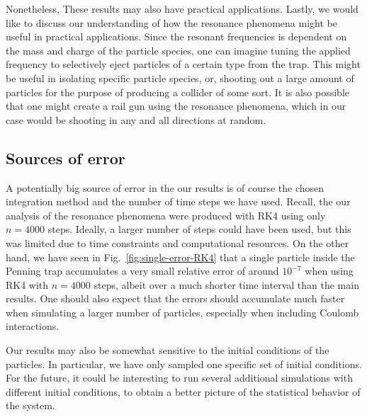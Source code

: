 \documentclass[english,notitlepage,reprint]{revtex4-2}  %
\begin{document}
Nonetheless, These results may also have practical applications.
Lastly, we would like to discuss our understanding of how the resonance phenomena might be useful in practical applications. Since the resonant frequencies is dependent on the mass and charge of the particle species, one can imagine tuning the applied frequency to selectively eject particles of a certain type from the trap. This might be useful in isolating specific particle species, or, shooting out a large amount of particles for the purpose of producing a collider of some sort. It is also possible that one might create a rail gun using the resonance phenomena, which in our case would be shooting in any and all directions at random. 


\subsection{Sources of error}
A potentially big source of error in the our results is of course the chosen integration method and the number of time steps we have used.
Recall, the our analysis of the resonance phenomena were produced with RK4 using only $n=4000$ steps. Ideally, a larger number of steps could have been used, but this was limited due to time constraints and computational resources. On the other hand, we have seen in Fig.~\ref{fig:single-error-RK4} that a single particle inside the Penning trap accumulates a very small relative error of around \(10^{-7}\) when using RK4 with \(n=4000\) steps, albeit over a much shorter time interval than the main results. One should also expect that the errors should accumulate much faster when simulating a larger number of particles, especially when including Coulomb interactions.

Our results may also be somewhat sensitive to the initial conditions of the particles. In particular, we have only sampled one specific set of initial conditions. For the future, it could be interesting to run several additional simulations with different initial conditions, to obtain a better picture of the statistical behavior of the system.

\end{document}
